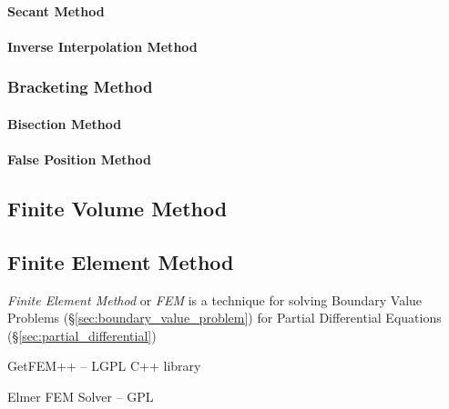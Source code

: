 \paragraph{Secant Method}\label{sec:secant_method}\hfill

\paragraph{Inverse Interpolation Method}\label{sec:inverse_interpolation}\hfill



\subsubsection{Bracketing Method}\label{sec:bracketing_method}

\paragraph{Bisection Method}\label{sec:bisection_method}\hfill

\paragraph{False Position Method}\label{sec:false_position}\hfill



\subsection{Finite Volume Method}\label{sec:finite_volume_method}

\subsection{Finite Element Method}\label{sec:finite_element_method}

\emph{Finite Element Method} or \emph{FEM} is a technique for solving Boundary
Value Problems (\S\ref{sec:boundary_value_problem}) for Partial Differential
Equations (\S\ref{sec:partial_differential})

GetFEM++ -- LGPL C++ library

Elmer FEM Solver -- GPL



